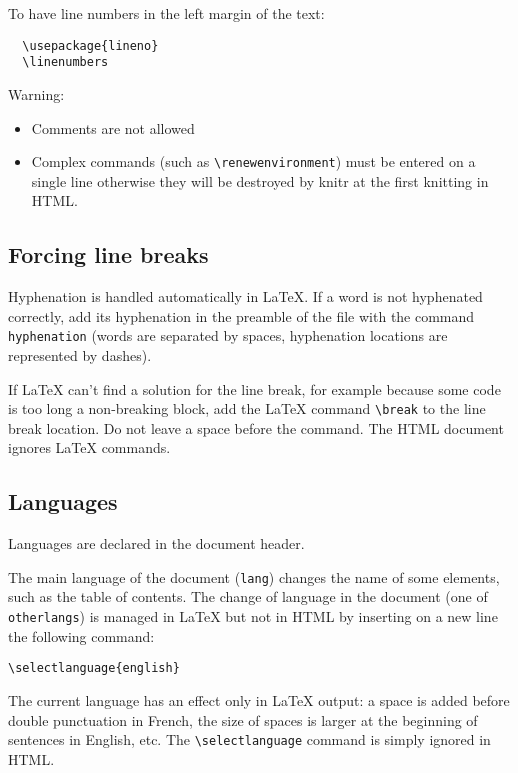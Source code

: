 \documentclass[fleqn,]{article} %
\providecommand{\tightlist}{%
  \setlength{\itemsep}{0pt}\setlength{\parskip}{0pt}}
\begin{document}
To have line numbers in the left margin of the text:

\begin{verbatim}
  \usepackage{lineno}
  \linenumbers
\end{verbatim}

Warning:

\begin{itemize}
\tightlist
\item
  Comments are not allowed
\item
  Complex commands (such as \texttt{\textbackslash{}renewenvironment}) must be entered on a single line otherwise they will be destroyed by knitr at the first knitting in HTML.
\end{itemize}

\hypertarget{forcing-line-breaks}{%
\subsection{Forcing line breaks}\label{forcing-line-breaks}}

Hyphenation is handled automatically in LaTeX.
If a word is not hyphenated correctly, add its hyphenation in the preamble of the file with the command \texttt{hyphenation} (words are separated by spaces, hyphenation locations are represented by dashes).

If LaTeX can't find a solution for the line break, for example because some code is too long a non-breaking block, add the LaTeX command \texttt{\textbackslash{}break} to the line break location.
Do not leave a space before the command.
The HTML document ignores LaTeX commands.

\hypertarget{languages}{%
\subsection{Languages}\label{languages}}

Languages are declared in the document header.

The main language of the document (\texttt{lang}) changes the name of some elements, such as the table of contents.
The change of language in the document (one of \texttt{otherlangs}) is managed in LaTeX but not in HTML by inserting on a new line the following command:

\begin{verbatim}
\selectlanguage{english}
\end{verbatim}

The current language has an effect only in LaTeX output: a space is added before double punctuation in French, the size of spaces is larger at the beginning of sentences in English, etc.
The \texttt{\textbackslash{}selectlanguage} command is simply ignored in HTML.
\end{document}
